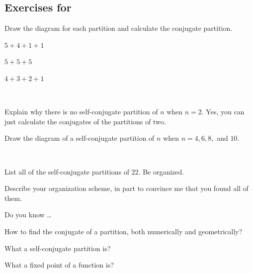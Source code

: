 \subsection*{Exercises for  \subselfconj}

\begin{exer}[\exerP] %
\label{exer_diagram_partition}
Draw the diagram for each partition and calculate the conjugate partition.
    \begin{exerpart}
        \item $5+4+1+1$
        \item $5+5+5$
        \item $4+3+2+1$
    \end{exerpart}
\end{exer}

\begin{exer}[\exerU] %
\label{exer_even_selfconj_examples}
~
    \begin{exerpart}
        \item Explain why there is no self-conjugate partition of $n$ when $n=2$.  Yes, you can just calculate the conjugates of the partitions of two.
        \item Draw the diagram of a self-conjugate partition of $n$ when $n=4, 6, 8,$ and $10$. 
    \end{exerpart}
\end{exer}

\begin{exer}[\exerU] %
\label{exer_partitions22}
~    
    \begin{exerpart}
        \item List all of the self-conjugate partitions of 22.  Be organized.
        \item Describe your organization scheme, in part to convince me that you found all of them.        
    \end{exerpart}
\end{exer}

\begin{exer}[\exerR] %
\label{exer_dyk_conj_partition}
    Do you know \ldots
        \begin{exerpart}
            \item How to find the conjugate of a partition, both numerically and geometrically?
            \item What a self-conjugate partition is?
            \item What a fixed point of a function is? 
        \end{exerpart}
\end{exer}

